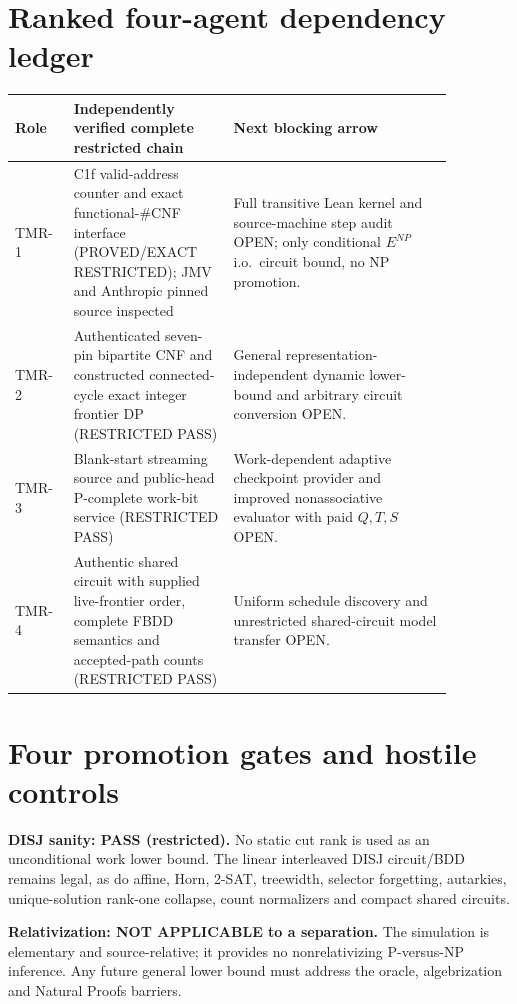 \documentclass[11pt]{article}
\begin{document}
\section{Ranked four-agent dependency ledger}
\begin{center}
\begin{tabular}{p{0.11\linewidth}p{0.32\linewidth}p{0.44\linewidth}}
Role & Independently verified complete restricted chain & Next blocking arrow\\\hline
TMR-1 & C1f valid-address counter and exact functional-\#CNF interface
(PROVED/EXACT RESTRICTED); JMV and Anthropic pinned source inspected &
Full transitive Lean kernel and source-machine step audit OPEN;
only conditional \(E^{NP}\) i.o.\ circuit bound, no NP promotion.\\
TMR-2 & Authenticated seven-pin bipartite CNF and constructed
connected-cycle exact integer frontier DP (RESTRICTED PASS) &
General representation-independent dynamic lower-bound and
arbitrary circuit conversion OPEN.\\
TMR-3 & Blank-start streaming source and public-head
P-complete work-bit service (RESTRICTED PASS) &
Work-dependent adaptive checkpoint provider and improved
nonassociative evaluator with paid \(Q,T,S\) OPEN.\\
TMR-4 & Authentic shared circuit with supplied live-frontier order,
complete FBDD semantics and accepted-path counts (RESTRICTED PASS) &
Uniform schedule discovery and unrestricted shared-circuit
model transfer OPEN.\\
\end{tabular}
\end{center}

\section{Four promotion gates and hostile controls}
\noindent\textbf{DISJ sanity: PASS (restricted).} No static cut
rank is used as an unconditional work lower bound. The linear
interleaved DISJ circuit/BDD remains legal, as do affine, Horn,
2-SAT, treewidth, selector forgetting, autarkies, unique-solution
rank-one collapse, count normalizers and compact shared circuits.

\noindent\textbf{Relativization: NOT APPLICABLE to a separation.}
The simulation is elementary and source-relative; it provides no
nonrelativizing P-versus-NP inference. Any future general lower bound
must address the oracle, algebrization and Natural Proofs barriers.
\end{document}
